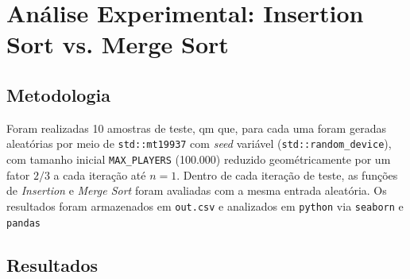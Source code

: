 \documentclass[11pt,a4paper]{article}
\begin{document}
\section{Análise Experimental: Insertion Sort vs. Merge Sort}
 
\subsection{Metodologia}

Foram realizadas 10 amostras de teste, qm que, para cada uma foram geradas aleatórias por meio de \texttt{std::mt19937} com \textit{seed} variável (\texttt{std::random\_device}), com tamanho inicial \texttt{MAX\_PLAYERS} (100.000) reduzido geométricamente por um fator $2/3$ a cada iteração até $n=1$. Dentro de cada iteração de teste, as funções de \textit{Insertion} e \textit{Merge Sort} foram avaliadas com a mesma entrada aleatória. Os resultados foram armazenados em \texttt{out.csv} e analizados em \texttt{python} via \texttt{seaborn} e \texttt{pandas}
 
\subsection{Resultados}
 
\end{document}
